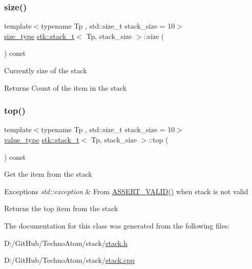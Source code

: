 \subsubsection{\texorpdfstring{size()}{size()}}
{\footnotesize\ttfamily template$<$typename Tp , std\+::size\+\_\+t stack\+\_\+size = 10$>$ \\
\hyperlink{classstk_1_1stack__t_ade199c494a8e4455f76cc04faf138ed8}{size\+\_\+type} \hyperlink{classstk_1_1stack__t}{stk\+::stack\+\_\+t}$<$ Tp, stack\+\_\+size $>$\+::size (\begin{DoxyParamCaption}{ }\end{DoxyParamCaption}) const\hspace{0.3cm}{\ttfamily [inline]}}

Currently size of the stack \begin{DoxyReturn}{Returns}
Count of the item in the stack 
\end{DoxyReturn}
\mbox{\label{classstk_1_1stack__t_a120f150bc90f8ccf0c0ca8396bda7c65}} 
\subsubsection{\texorpdfstring{top()}{top()}}
{\footnotesize\ttfamily template$<$typename Tp , std\+::size\+\_\+t stack\+\_\+size = 10$>$ \\
\hyperlink{classstk_1_1stack__t_a05d1586fa8257268f0c1ade7ffc4588e}{value\+\_\+type} \hyperlink{classstk_1_1stack__t}{stk\+::stack\+\_\+t}$<$ Tp, stack\+\_\+size $>$\+::top (\begin{DoxyParamCaption}{ }\end{DoxyParamCaption}) const\hspace{0.3cm}{\ttfamily [inline]}}

Get the item from the stack 
\begin{DoxyExceptions}{Exceptions}
{\em std\+::exception} & From \hyperlink{stack_8h_a4ad7af85cae2910ffcf6bfbcb8278886}{A\+S\+S\+E\+R\+T\+\_\+\+V\+A\+L\+I\+D()} when stack is not valid \\
\hline
\end{DoxyExceptions}
\begin{DoxyReturn}{Returns}
the top item from the stack 
\end{DoxyReturn}


The documentation for this class was generated from the following files\+:\begin{DoxyCompactItemize}
\item 
D\+:/\+Git\+Hub/\+Techno\+Atom/stack/\hyperlink{stack_8h}{stack.\+h}\item 
D\+:/\+Git\+Hub/\+Techno\+Atom/stack/\hyperlink{stack_8cpp}{stack.\+cpp}\end{DoxyCompactItemize}
